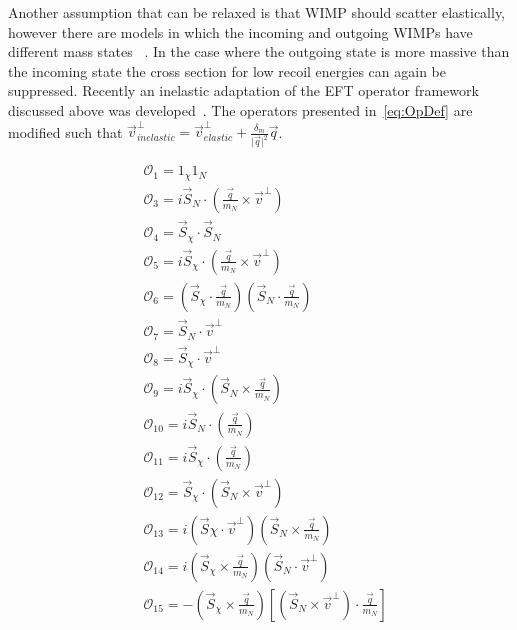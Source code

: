 	    Another assumption that can be relaxed is that WIMP should scatter elastically, however there are models in which the incoming and outgoing WIMPs have different mass states ~\cite{InelasticIntro}. In the case where the outgoing state is more massive than the incoming state the cross section for low recoil energies can again be suppressed. Recently an inelastic adaptation of the EFT operator framework discussed above was developed~\cite{InelasticMath}. The operators presented in~\ref{eq:OpDef} are modified such that $\vec{v}^\perp_{inelastic} = \vec{v}^\perp_{elastic} +\frac{\delta_m}{\vert{\vec{q}}\vert^2}\vec{q}$.       
	    

\begin{equation} \label{eq:OpDef}
\begin{split}
&\mathcal{O}_1 = 1_{\chi} 1_N  \\
&\mathcal{O}_3 = i\vec{S}_N\cdot (\frac{\vec{q}}{m_N}\times\vec{v}^\perp) \\
&\mathcal{O}_4 = \vec{S}_{\chi}\cdot \vec{S}_N \\
&\mathcal{O}_5 = i\vec{S}_{\chi}\cdot (\frac{\vec{q}}{m_N}\times\vec{v}^\perp) \\
&\mathcal{O}_6 = (\vec{S}_{\chi} \cdot \frac{\vec{q}}{m_N})(\vec{S}_N \cdot \frac{\vec{q}}{m_N}) \\
&\mathcal{O}_7 = \vec{S}_N \cdot \vec{v}^\perp \\
&\mathcal{O}_8 = \vec{S}_{\chi} \cdot \vec{v}^\perp \\
&\mathcal{O}_9 = i\vec{S}_{\chi} \cdot(\vec{S}_N \times \frac{\vec{q}}{m_N}) \\
&\mathcal{O}_{10} = i\vec{S}_N \cdot (\frac{\vec{q}}{m_N}) \\
&\mathcal{O}_{11} = i\vec{S}_{\chi} \cdot (\frac{\vec{q}}{m_N}) \\
&\mathcal{O}_{12} = \vec{S}_\chi \cdot (\vec{S}_N \times \vec{v}^\perp) \\
&\mathcal{O}_{13} = i(\vec{S}\chi \cdot \vec{v}^\perp)(\vec{S}_N \times \frac{\vec{q}}{m_N})\\
&\mathcal{O}_{14} = i(\vec{S}_\chi \times \frac{\vec{q}}{m_N})(\vec{S}_N \cdot \vec{v}^\perp) \\
&\mathcal{O}_{15} = -(\vec{S}_\chi \times \frac{\vec{q}}{m_N})[(\vec{S}_N \times \vec{v}^\perp)\cdot \frac{\vec{q}}{m_N}]
\end{split}
\end{equation}

